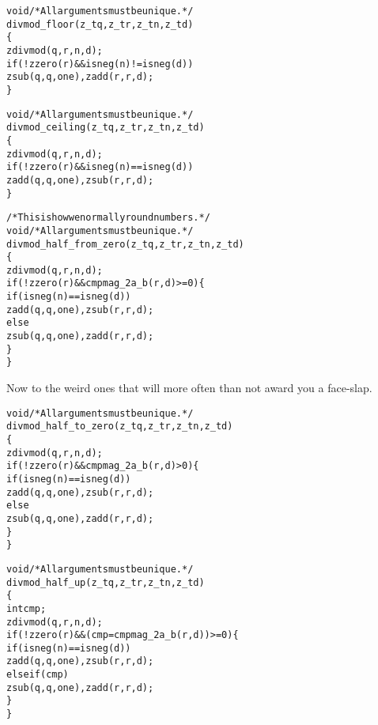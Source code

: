 \begin{alltt}
   void \textcolor{c}{/* \textrm{All arguments must be unique.} */}
   divmod_floor(z_t q, z_t r, z_t n, z_t d)
   \{
       zdivmod(q, r, n, d);
       if (!zzero(r) && isneg(n) != isneg(d))
           zsub(q, q, one), zadd(r, r, d);
   \}
\end{alltt}

\begin{alltt}
   void \textcolor{c}{/* \textrm{All arguments must be unique.} */}
   divmod_ceiling(z_t q, z_t r, z_t n, z_t d)
   \{
       zdivmod(q, r, n, d);
       if (!zzero(r) && isneg(n) == isneg(d))
           zadd(q, q, one), zsub(r, r, d);
   \}
\end{alltt}

\begin{alltt}
   /* \textrm{This is how we normally round numbers.} */
   void \textcolor{c}{/* \textrm{All arguments must be unique.} */}
   divmod_half_from_zero(z_t q, z_t r, z_t n, z_t d)
   \{
       zdivmod(q, r, n, d);
       if (!zzero(r) && cmpmag_2a_b(r, d) >= 0) \{
           if (isneg(n) == isneg(d))
               zadd(q, q, one), zsub(r, r, d);
           else
               zsub(q, q, one), zadd(r, r, d);
       \}
   \}
\end{alltt}

\noindent
Now to the weird ones that will more often than
not award you a face-slap. %

\begin{alltt}
   void \textcolor{c}{/* \textrm{All arguments must be unique.} */}
   divmod_half_to_zero(z_t q, z_t r, z_t n, z_t d)
   \{
       zdivmod(q, r, n, d);
       if (!zzero(r) && cmpmag_2a_b(r, d) > 0) \{
           if (isneg(n) == isneg(d))
               zadd(q, q, one), zsub(r, r, d);
           else
               zsub(q, q, one), zadd(r, r, d);
       \}
   \}
\end{alltt}

\begin{alltt}
   void \textcolor{c}{/* \textrm{All arguments must be unique.} */}
   divmod_half_up(z_t q, z_t r, z_t n, z_t d)
   \{
       int cmp;
       zdivmod(q, r, n, d);
       if (!zzero(r) && (cmp = cmpmag_2a_b(r, d)) >= 0) \{
           if (isneg(n) == isneg(d))
               zadd(q, q, one), zsub(r, r, d);
           else if (cmp)
               zsub(q, q, one), zadd(r, r, d);
       \}
   \}
\end{alltt}

